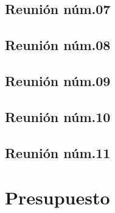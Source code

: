\documentclass[10pt,spanish]{article}
\let\stdsection\section
\renewcommand\section{\newpage\stdsection}
\begin{document}
\subsection{Reunión núm.07}\label{subsec:r7}
\label{anex:actaReunion7}

\newpage

\subsection{Reunión núm.08}\label{subsec:r8}
\label{anex:actaReunion8}

\newpage

\subsection{Reunión núm.09}\label{subsec:r9}
\label{anex:actaReunion9}

\newpage

\subsection{Reunión núm.10}\label{subsec:r10}
\label{anex:actaReunion10}

\newpage

\subsection{Reunión núm.11}\label{subsec:r11}
\label{anex:actaReunion11}

\newpage

%


\section{Presupuesto}
%

\end{document}

